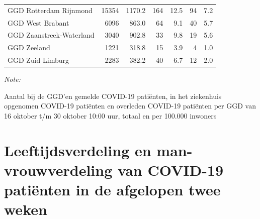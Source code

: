 \documentclass[
  english,
  man,floatsintext]{apa6}
\begin{document}
\begin{table}[H]
\begin{threeparttable}
\begin{tabular}{lrrrrrr}
GGD Rotterdam Rijnmond & 15354 & 1170.2 & 164 & 12.5 & 94 & 7.2\\
GGD West Brabant & 6096 & 863.0 & 64 & 9.1 & 40 & 5.7\\
GGD Zaanstreek-Waterland & 3040 & 902.8 & 33 & 9.8 & 19 & 5.6\\
GGD Zeeland & 1221 & 318.8 & 15 & 3.9 & 4 & 1.0\\
GGD Zuid Limburg & 2283 & 382.2 & 40 & 6.7 & 12 & 2.0\\
\bottomrule
\end{tabular}
\begin{tablenotes}
\item \textit{Note: } 
\item Aantal bij de GGD’en gemelde COVID-19 patiënten, in het ziekenhuis opgenomen COVID-19 patiënten en overleden COVID-19 patiënten per GGD van 16 oktober t/m 30 oktober 10:00 uur, totaal en per 100.000 inwoners
\end{tablenotes}
\end{threeparttable}
\endgroup{}
\end{table}

\newpage

\hypertarget{leeftijdsverdeling-en-man-vrouwverdeling-van-covid-19-patiuxebnten-in-de-afgelopen-twee-weken}{%
\section{Leeftijdsverdeling en man-vrouwverdeling van COVID-19 patiënten in de afgelopen twee weken}\label{leeftijdsverdeling-en-man-vrouwverdeling-van-covid-19-patiuxebnten-in-de-afgelopen-twee-weken}}
\end{document}
